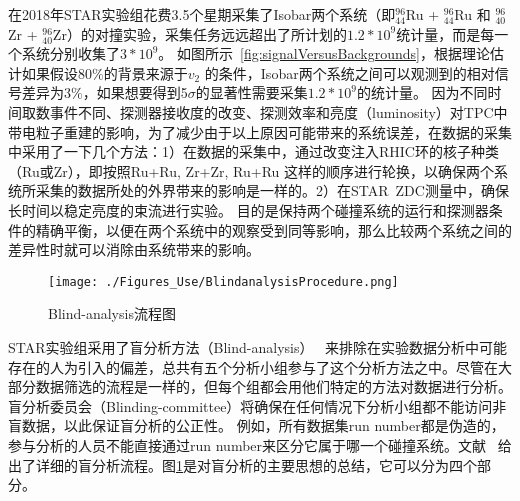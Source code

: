 在2018年STAR实验组花费3.5个星期采集了Isobar两个系统（即$^{96}_{44}$Ru + $^{96}_{44}$Ru  和 $^{96}_{40}$Zr + $^{96}_{40}$Zr）的对撞实验，采集任务远远超出了所计划的$1.2*10^9$统计量，而是每一个系统分别收集了$3*10^9$\cite{STARBlinding}。
如图所示~\ref{fig:signalVersusBackgrounds}，根据理论估计如果假设$80\%$的背景来源于$v_2$ 的条件，Isobar两个系统之间可以观测到的相对信号差异为$3\%$，如果想要得到5$\sigma$的显著性需要采集$1.2*10^9$的统计量。
因为不同时间取数事件不同、探测器接收度的改变、探测效率和亮度（luminosity）对TPC中带电粒子重建的影响，为了减少由于以上原因可能带来的系统误差，在数据的采集中采用了一下几个方法：1）在数据的采集中，通过改变注入RHIC环的核子种类（Ru或Zr），即按照Ru+Ru, Zr+Zr, Ru+Ru 这样的顺序进行轮换，以确保两个系统所采集的数据所处的外界带来的影响是一样的。2）在STAR~ZDC测量中，确保长时间以稳定亮度的束流进行实验。
目的是保持两个碰撞系统的运行和探测器条件的精确平衡，以便在两个系统中的观察受到同等影响，那么比较两个系统之间的差异性时就可以消除由系统带来的影响。

\begin{figure}[htb]
\begin{center}
\texttt{[image: ./Figures\_Use/BlindanalysisProcedure.png]}
\end{center}
\caption{Blind-analysis流程图~\cite{Tribedy_2020}}
\label{fig:BlindanalysisProcedure}
\end{figure}

STAR实验组采用了盲分析方法（Blind-analysis）~\cite{STARBlinding} 来排除在实验数据分析中可能存在的人为引入的偏差，总共有五个分析小组参与了这个分析方法之中。尽管在大部分数据筛选的流程是一样的，但每个组都会用他们特定的方法对数据进行分析。盲分析委员会（Blinding-committee）将确保在任何情况下分析小组都不能访问非盲数据，以此保证盲分析的公正性。 例如，所有数据集run number都是伪造的，参与分析的人员不能直接通过run number来区分它属于哪一个碰撞系统。文献~\cite{STARBlinding} 给出了详细的盲分析流程。图\ref{fig:BlindanalysisProcedure}是对盲分析的主要思想的总结，它可以分为四个部分。


